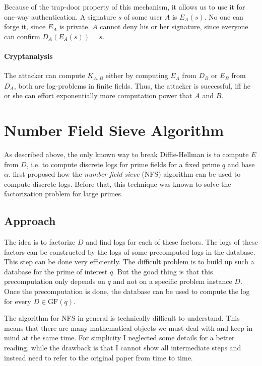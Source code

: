 \documentclass[paper=a4, fontsize=11pt]{scrartcl} %
\numberwithin{equation}{section} %
\numberwithin{figure}{section} %
\numberwithin{table}{section} %
\begin{document}
Because of the trap-door property of this mechanism, it allows us to use it for one-way authentication. A signature $s$ of some user $A$ is $E_A(s)$. No one can forge it, since $E_A$ is private. $A$ cannot deny his or her signature, since everyone can confirm $D_A(E_A(s)) = s$.

\paragraph{Cryptanalysis}
The attacker can compute $K_{A,B}$ either by computing $E_A$ from $D_B$ or $E_B$ from $D_A$, both are log-problems in finite fields. Thus, the attacker is successful, iff he or she can effort exponentially more computation power that $A$ and $B$.

\section{Number Field Sieve Algorithm}
As described above, the only known way to break Diffie-Hellman is to compute $E$ from $D$, i.e. to compute discrete logs for prime fields for a fixed prime $q$ and base $\alpha$. \citep{gordon1993discrete} first proposed how the \textit{number field sieve} (NFS) algorithm can be used to compute discrete logs. Before that, this technique was known to solve the factorization problem for large primes.

\subsection{Approach}
The idea is to factorize $D$ and find logs for each of these factors. The logs of these factors can be constructed by the logs of some precomputed logs in the database. This step can be done very efficiently. The difficult problem is to build up such a database for the prime of interest $q$. But the good thing is that this precomputation only depends on $q$ and not on a specific problem instance $D$. Once the precomputation is done, the database can be used to compute the log for every $D\in \mathrm{GF}(q)$.

The algorithm for NFS in general is technically difficult to understand. This means that there are many mathematical objects we must deal with and keep in mind at the same time. For simplicity I neglected some details for a better reading, while the drawback is that I cannot show all intermediate steps and instead need to refer to the original paper from time to time.
\end{document}
